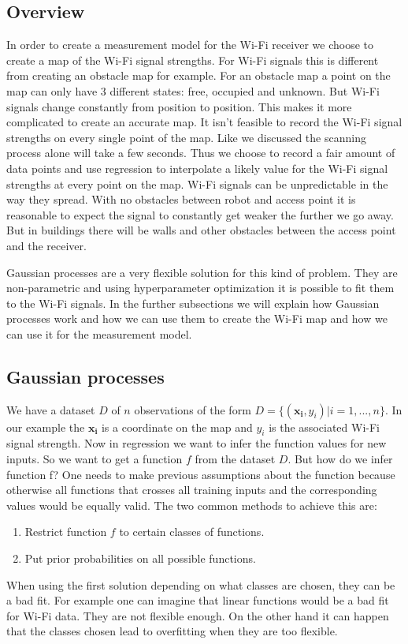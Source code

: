 \subsection{Overview}
In order to create a measurement model for the Wi-Fi receiver we choose to create a map of the Wi-Fi signal strengths. For Wi-Fi signals this is different from creating an obstacle map for example. For an obstacle map a point on the map can only have 3 different states: free, occupied and unknown. But Wi-Fi signals change constantly from position to position. This makes it more complicated to create an accurate map. It isn't feasible to record the Wi-Fi signal strengths on every single point of the map. Like we discussed the scanning process alone will take a few seconds. Thus we choose to record a fair amount of data points and use regression to interpolate a likely value for the Wi-Fi signal strengths at every point on the map. Wi-Fi signals can be unpredictable in the way they spread. With no obstacles between robot and access point it is reasonable to expect the signal to constantly get weaker the further we go away. But in buildings there will be walls and other obstacles between the access point and the receiver. 

Gaussian processes are a very flexible solution for this kind of problem. They are non-parametric and using hyperparameter optimization it is possible to fit them to the Wi-Fi signals. In the further subsections we will explain how Gaussian processes work and how we can use them to create the Wi-Fi map and how we can use it for the measurement model.

\subsection{Gaussian processes}
We have a dataset $D$ of $n$ observations of the form $D=\{(\mathbf{x_i},y_i)|i = 1,...,n\}$. In our example the $\mathbf{x_i}$ is a coordinate on the map and $y_i$ is the associated Wi-Fi signal strength. Now in regression we want to infer the function values for new inputs. So we want to get a function $f$ from the dataset $D$. 
But how do we infer function f? One needs to make previous assumptions about the function because otherwise all functions that crosses all training inputs and the corresponding values would be equally valid. The two common methods to achieve this are: \cite[p. 2]{Rasmussen:2005:GPM:1162254}
\begin{enumerate}
	\setlength\itemsep{0 em}
	\item Restrict function $f$ to certain classes of functions.
	\item Put prior probabilities on all possible functions.
\end{enumerate}
When using the first solution depending on what classes are chosen, they can be a bad fit. For example one can imagine that linear functions would be a bad fit for Wi-Fi data. They are not flexible enough. On the other hand it can happen that the classes chosen lead to overfitting when they are too flexible. \cite[p. 2]{Rasmussen:2005:GPM:1162254}

